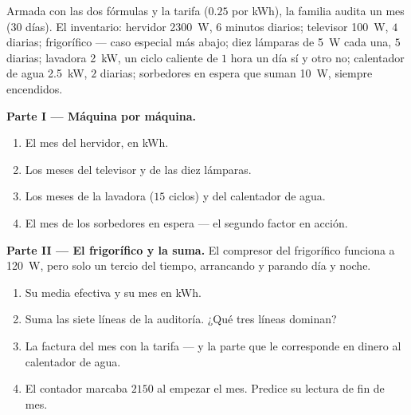 \begin{problem}\label{pb:g9:electric-power-energy:1}
Armada con las dos fórmulas y la tarifa ($0.25$ por \unit{kWh}), la
familia audita un mes (30 días). El inventario: hervidor
\qty{2300}{W}, $6$ minutos diarios; televisor \qty{100}{W}, $4$
 diarias; frigorífico --- caso especial más abajo; diez
lámparas de \qty{5}{W} cada una, $5$  diarias; lavadora
\qty{2}{kW}, un ciclo caliente de $1$ hora un día sí y otro no;
calentador de agua \qty{2.5}{kW}, $2$  diarias; sorbedores
en espera que suman \qty{10}{W}, siempre encendidos.

\medskip\noindent\textbf{Parte I --- Máquina por máquina.}
\begin{enumerate}
  \item El mes del hervidor, en \unit{kWh}.
  \item Los meses del televisor y de las diez lámparas.
  \item Los meses de la lavadora ($15$ ciclos) y del calentador de
        agua.
  \item El mes de los sorbedores en espera --- el segundo factor en
        acción.
\end{enumerate}

\medskip\noindent\textbf{Parte II --- El frigorífico y la suma.}
El compresor del frigorífico funciona a \qty{120}{W}, pero solo un
tercio del tiempo, arrancando y parando día y noche.
\begin{enumerate}[resume]
  \item Su  media efectiva y su mes en \unit{kWh}.
  \item Suma las siete líneas de la auditoría. ¿Qué tres líneas
        dominan?
  \item La factura del mes con la tarifa --- y la parte que le
        corresponde en dinero al calentador de agua.
  \item El contador marcaba $2150$  al empezar el mes.
        Predice su lectura de fin de mes.
\end{enumerate}


\end{problem}
